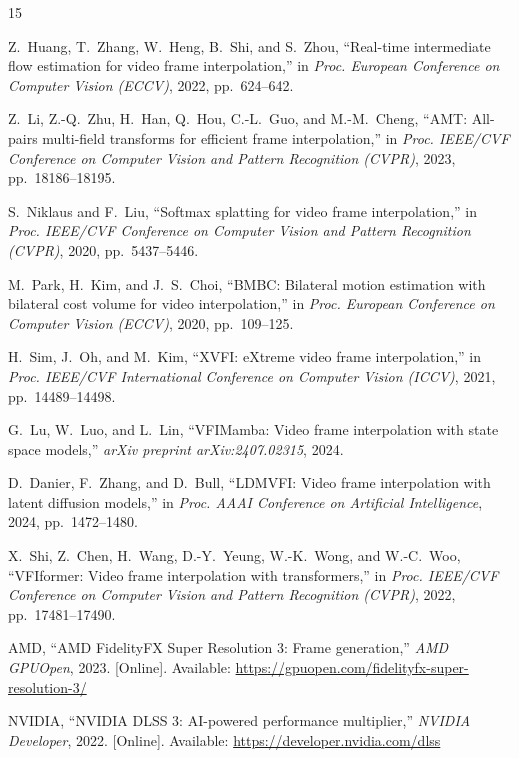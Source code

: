 \documentclass{article}
\begin{document}
\begin{thebibliography}{15}

Z.~Huang, T.~Zhang, W.~Heng, B.~Shi, and S.~Zhou,
``Real-time intermediate flow estimation for video frame interpolation,''
in \textit{Proc. European Conference on Computer Vision (ECCV)}, 2022, pp.~624--642.

Z.~Li, Z.-Q.~Zhu, H.~Han, Q.~Hou, C.-L.~Guo, and M.-M.~Cheng,
``AMT: All-pairs multi-field transforms for efficient frame interpolation,''
in \textit{Proc. IEEE/CVF Conference on Computer Vision and Pattern Recognition (CVPR)}, 2023, pp.~18186--18195.

S.~Niklaus and F.~Liu,
``Softmax splatting for video frame interpolation,''
in \textit{Proc. IEEE/CVF Conference on Computer Vision and Pattern Recognition (CVPR)}, 2020, pp.~5437--5446.

M.~Park, H.~Kim, and J.~S.~Choi,
``BMBC: Bilateral motion estimation with bilateral cost volume for video interpolation,''
in \textit{Proc. European Conference on Computer Vision (ECCV)}, 2020, pp.~109--125.

H.~Sim, J.~Oh, and M.~Kim,
``XVFI: eXtreme video frame interpolation,''
in \textit{Proc. IEEE/CVF International Conference on Computer Vision (ICCV)}, 2021, pp.~14489--14498.

G.~Lu, W.~Luo, and L.~Lin,
``VFIMamba: Video frame interpolation with state space models,''
\textit{arXiv preprint arXiv:2407.02315}, 2024.

D.~Danier, F.~Zhang, and D.~Bull,
``LDMVFI: Video frame interpolation with latent diffusion models,''
in \textit{Proc. AAAI Conference on Artificial Intelligence}, 2024, pp.~1472--1480.

X.~Shi, Z.~Chen, H.~Wang, D.-Y.~Yeung, W.-K.~Wong, and W.-C.~Woo,
``VFIformer: Video frame interpolation with transformers,''
in \textit{Proc. IEEE/CVF Conference on Computer Vision and Pattern Recognition (CVPR)}, 2022, pp.~17481--17490.

AMD,
``AMD FidelityFX Super Resolution 3: Frame generation,''
\textit{AMD GPUOpen}, 2023. [Online]. Available: \url{https://gpuopen.com/fidelityfx-super-resolution-3/}

NVIDIA,
``NVIDIA DLSS 3: AI-powered performance multiplier,''
\textit{NVIDIA Developer}, 2022. [Online]. Available: \url{https://developer.nvidia.com/dlss}


\end{thebibliography}
\end{document}
